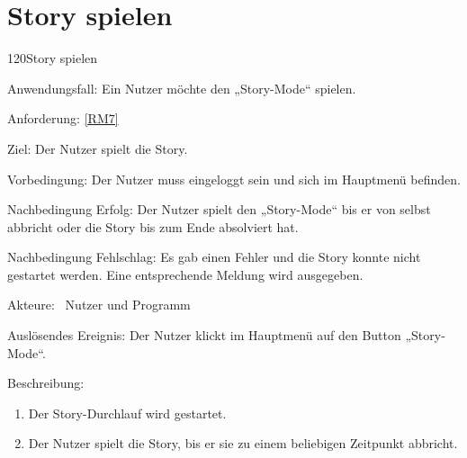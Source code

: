 \section{Story spielen}
\begin{function}{120}{Story spielen}
\item[Anwendungsfall:] Ein Nutzer möchte den „Story-Mode“ spielen. 
\item[Anforderung:] \ref{RM7}
\item[Ziel:] Der Nutzer spielt die Story.
\item[Vorbedingung:] Der Nutzer muss eingeloggt sein und sich im Hauptmenü befinden.
\item[Nachbedingung Erfolg:]  Der Nutzer spielt den „Story-Mode“ bis er von selbst abbricht oder die Story bis zum Ende absolviert hat.
\item[Nachbedingung Fehlschlag:] Es gab einen Fehler und die Story konnte nicht gestartet werden. Eine entsprechende Meldung wird ausgegeben.
\item[Akteure:] ~Nutzer und Programm
\item[Auslösendes Ereignis:] Der Nutzer klickt im Hauptmenü auf den Button „Story-Mode“.
\item[Beschreibung:] ~
\begin{enumerate}
  \item  Der Story-Durchlauf wird gestartet.
  \item  Der Nutzer spielt die Story, bis er sie zu einem beliebigen Zeitpunkt abbricht.
\end{enumerate}
\end{function}

